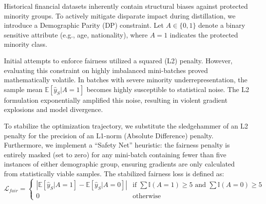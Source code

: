 \documentclass{wscpaperproc}
\theoremstyle{wsc}
\begin{document}


Historical financial datasets inherently contain structural biases against protected minority groups. To actively mitigate disparate impact during distillation, we introduce a Demographic Parity (DP) constraint. Let $A \in \{0, 1\}$ denote a binary sensitive attribute (e.g., age, nationality), where $A=1$ indicates the protected minority class.

Initial attempts to enforce fairness utilized a squared (L2) penalty. However, evaluating this constraint on highly imbalanced mini-batches proved mathematically volatile. In batches with severe minority underrepresentation, the sample mean $\mathbb{E}[\hat{y}_S | A=1]$ becomes highly susceptible to statistical noise. The L2 formulation exponentially amplified this noise, resulting in violent gradient explosions and model divergence.

To stabilize the optimization trajectory, we substitute the sledgehammer of an L2 penalty for the precision of an L1-norm (Absolute Difference) penalty. Furthermore, we implement a ``Safety Net'' heuristic: the fairness penalty is entirely masked (set to zero) for any mini-batch containing fewer than five instances of either demographic group, ensuring gradients are only calculated from statistically viable samples. The stabilized fairness loss is defined as:
\begin{equation} \label{eq:fair}
    \mathcal{L}_{fair} = \begin{cases} 
      \left| \mathbb{E}[\hat{y}_S | A=1] - \mathbb{E}[\hat{y}_S | A=0] \right| & \text{if } \sum \mathbb{I}(A=1) \ge 5 \text{ and } \sum \mathbb{I}(A=0) \ge 5 \\
      0 & \text{otherwise}
   \end{cases}
\end{equation}
\end{document}
